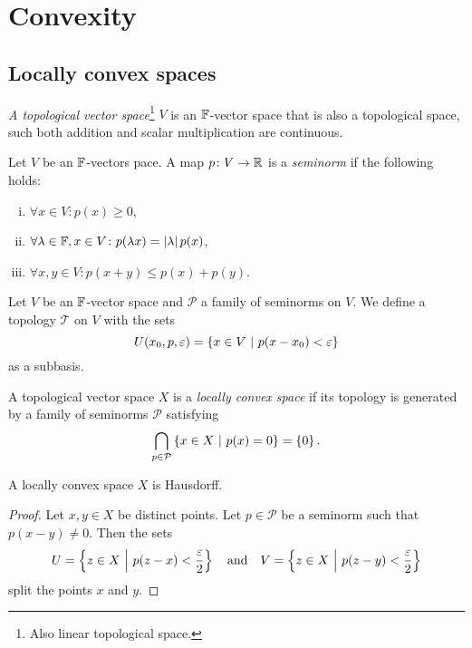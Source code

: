 \section{Convexity}

\subsection{Locally convex spaces}


\begin{definicija}
\emph{A topological vector space}\footnote{Also linear topological
space.} $V$ is an $\mathbb{F}$-vector space that is also a topological
space, such both addition and scalar multiplication are continuous.
\end{definicija}

\begin{definicija}
Let $V$ be an $\mathbb{F}$-vectors pace. A map $p \colon V \to \mathbb{R}$ is a
\emph{seminorm} if the following holds:

\begin{enumerate}[i)]
\item $\forall x \in V \colon p(x) \geq 0$,
\item $\forall \lambda \in \mathbb{F}, x \in V \colon
p(\lambda x) = \left\lvert \lambda\right\rvert p(x)$,
\item $\forall x, y \in V \colon p(x+y) \leq p(x) + p(y)$.
\end{enumerate}
\end{definicija}

\begin{definicija}
Let $V$ be an $\mathbb{F}$-vector space and $\mathcal{P}$ a family of
seminorms on $V$. We define a topology $\mathcal{T}$ on $V$ with
the sets
\[
U(x_0, p, \varepsilon) = \left\{x \in V~\middle\vert~p(x - x_0) < \varepsilon\right\}
\]
as a subbasis.
\end{definicija}

\begin{definicija}
A topological vector space $X$ is a
\emph{locally convex space} if its
topology is generated by a family of seminorms $\mathcal{P}$
satisfying
\[
\bigcap_{p \in \mathcal{P}} \left\{x \in X~\middle\vert~p(x) = 0\right\} = \left\{0\right\}.
\]
\end{definicija}

\begin{trditev}
A locally convex space $X$ is Hausdorff.
\end{trditev}

\begin{proof}
Let $x, y \in X$ be distinct points. Let $p \in \mathcal{P}$ be a
seminorm such that $p(x-y) \ne 0$. Then the sets
\[
U = \left\{z \in X~\middle\vert~p(z-x) < \frac{\varepsilon}{2}\right\}
\quad \text{and} \quad
V = \left\{z \in X~\middle\vert~p(z-y) < \frac{\varepsilon}{2}\right\}
\]
split the points $x$ and $y$.
\end{proof}

